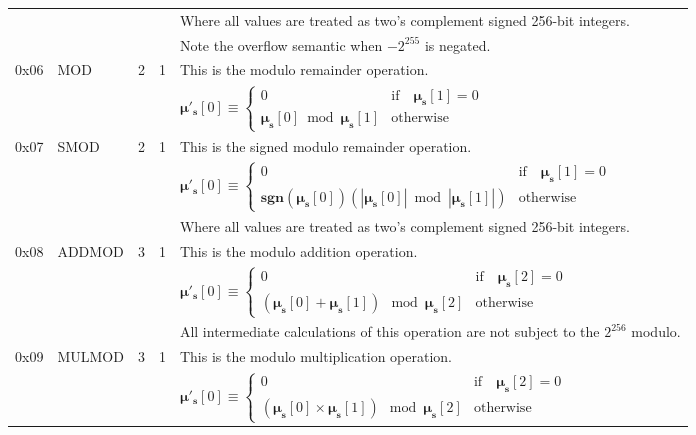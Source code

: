 \documentclass[9pt,oneside]{amsart}
\begin{document}
\begin{tabularx}{\textwidth}{rlrrX}
&&&& Where all values are treated as two's complement signed 256-bit integers. \\
&&&& Note the overflow semantic when $-2^{255}$ is negated.\\
\midrule
0x06 & {\small MOD} & 2 & 1 & This is the modulo remainder operation. \\
&&&& $\boldsymbol{\mu}'_\mathbf{s}[0] \equiv \begin{cases}0 & \text{if} \quad \boldsymbol{\mu}_\mathbf{s}[1] = 0\\ \boldsymbol{\mu}_\mathbf{s}[0] \bmod \boldsymbol{\mu}_\mathbf{s}[1] & \text{otherwise}\end{cases}$  \\
\midrule
0x07 & {\small SMOD} & 2 & 1 & This is the signed modulo remainder operation. \\
&&&& $\boldsymbol{\mu}'_\mathbf{s}[0] \equiv \begin{cases}0 & \text{if} \quad \boldsymbol{\mu}_\mathbf{s}[1] = 0\\ \mathbf{sgn} (\boldsymbol{\mu}_\mathbf{s}[0]) (|\boldsymbol{\mu}_\mathbf{s}[0]| \bmod |\boldsymbol{\mu}_\mathbf{s}[1]|) & \text{otherwise}\end{cases}$  \\
&&&& Where all values are treated as two's complement signed 256-bit integers. \\
\midrule
0x08 & {\small ADDMOD} & 3 & 1 & This is the modulo addition operation. \\
&&&& $\boldsymbol{\mu}'_\mathbf{s}[0] \equiv \begin{cases}0 & \text{if} \quad \boldsymbol{\mu}_\mathbf{s}[2] = 0\\ (\boldsymbol{\mu}_\mathbf{s}[0] + \boldsymbol{\mu}_\mathbf{s}[1]) \mod \boldsymbol{\mu}_\mathbf{s}[2] & \text{otherwise}\end{cases}$  \\
&&&& All intermediate calculations of this operation are not subject to the $2^{256}$ modulo. \\
\midrule
0x09 & {\small MULMOD} & 3 & 1 & This is the modulo multiplication operation. \\
&&&& $\boldsymbol{\mu}'_\mathbf{s}[0] \equiv \begin{cases}0 & \text{if} \quad \boldsymbol{\mu}_\mathbf{s}[2] = 0\\ (\boldsymbol{\mu}_\mathbf{s}[0] \times \boldsymbol{\mu}_\mathbf{s}[1]) \mod \boldsymbol{\mu}_\mathbf{s}[2] & \text{otherwise}\end{cases}$  \\

\end{tabularx}
\end{document}
